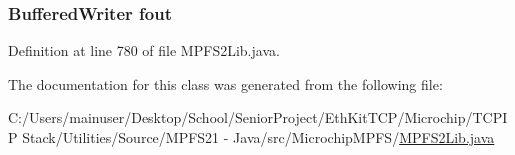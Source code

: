 \hypertarget{class_microchip_m_p_f_s_1_1_m_p_f_s2_lib_1_1_m_p_f_s2_b_i_n_writer_aac232ca8514f156a01d70fd44afdd7c1}{}
\subsubsection[{fout}]{\setlength{\rightskip}{0pt plus 5cm}Buffered\+Writer fout}\label{class_microchip_m_p_f_s_1_1_m_p_f_s2_lib_1_1_m_p_f_s2_b_i_n_writer_aac232ca8514f156a01d70fd44afdd7c1}


Definition at line 780 of file M\+P\+F\+S2\+Lib.\+java.



The documentation for this class was generated from the following file\+:\begin{DoxyCompactItemize}
\item 
C\+:/\+Users/mainuser/\+Desktop/\+School/\+Senior\+Project/\+Eth\+Kit\+T\+C\+P/\+Microchip/\+T\+C\+P\+I\+P Stack/\+Utilities/\+Source/\+M\+P\+F\+S21 -\/ Java/src/\+Microchip\+M\+P\+F\+S/\hyperlink{_m_p_f_s2_lib_8java}{M\+P\+F\+S2\+Lib.\+java}\end{DoxyCompactItemize}
